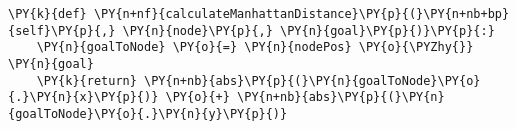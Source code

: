 \begin{Verbatim}[commandchars=\\\{\}]
\PY{k}{def} \PY{n+nf}{calculateManhattanDistance}\PY{p}{(}\PY{n+nb+bp}{self}\PY{p}{,} \PY{n}{node}\PY{p}{,} \PY{n}{goal}\PY{p}{)}\PY{p}{:}
    \PY{n}{goalToNode} \PY{o}{=} \PY{n}{nodePos} \PY{o}{\PYZhy{}} \PY{n}{goal}
    \PY{k}{return} \PY{n+nb}{abs}\PY{p}{(}\PY{n}{goalToNode}\PY{o}{.}\PY{n}{x}\PY{p}{)} \PY{o}{+} \PY{n+nb}{abs}\PY{p}{(}\PY{n}{goalToNode}\PY{o}{.}\PY{n}{y}\PY{p}{)}
\end{Verbatim}
